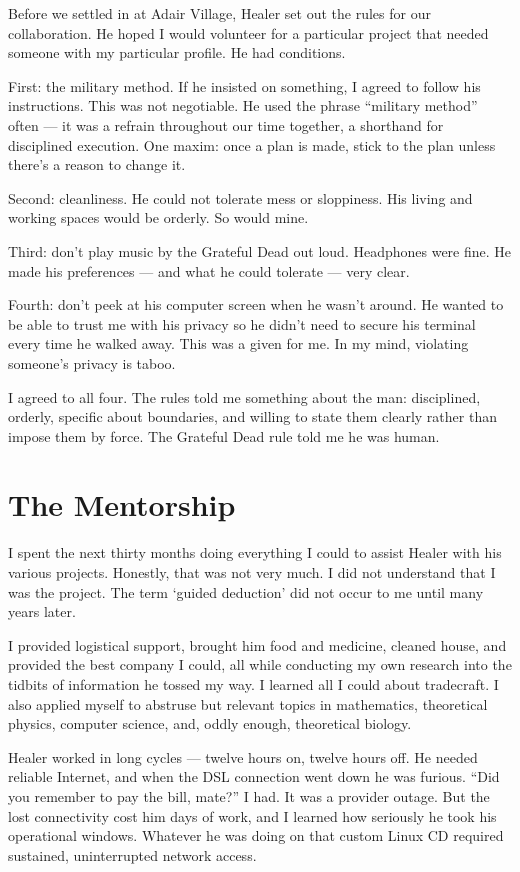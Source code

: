 Before we settled in at Adair Village, Healer set out the rules for our collaboration. He hoped I would volunteer for a particular project that needed someone with my particular profile. He had conditions.

First: the military method. If he insisted on something, I agreed to follow his instructions. This was not negotiable. He used the phrase ``military method'' often --- it was a refrain throughout our time together, a shorthand for disciplined execution. One maxim: once a plan is made, stick to the plan unless there's a reason to change it.

Second: cleanliness. He could not tolerate mess or sloppiness. His living and working spaces would be orderly. So would mine.

Third: don't play music by the Grateful Dead out loud. Headphones were fine. He made his preferences --- and what he could tolerate --- very clear.

Fourth: don't peek at his computer screen when he wasn't around. He wanted to be able to trust me with his privacy so he didn't need to secure his terminal every time he walked away. This was a given for me. In my mind, violating someone's privacy is taboo.

I agreed to all four. The rules told me something about the man: disciplined, orderly, specific about boundaries, and willing to state them clearly rather than impose them by force. The Grateful Dead rule told me he was human.

\section*{The Mentorship}
\label{record:af-the-mentorship}

I spent the next thirty months doing everything I could to assist Healer with his various projects. Honestly, that was not very much. I did not understand that I was the project. The term `guided deduction' did not occur to me until many years later.

I provided logistical support, brought him food and medicine, cleaned house, and provided the best company I could, all while conducting my own research into the tidbits of information he tossed my way. I learned all I could about tradecraft. I also applied myself to abstruse but relevant topics in mathematics, theoretical physics, computer science, and, oddly enough, theoretical biology.

Healer worked in long cycles --- twelve hours on, twelve hours off. He needed reliable Internet, and when the DSL connection went down he was furious. ``Did you remember to pay the bill, mate?'' I had. It was a provider outage. But the lost connectivity cost him days of work, and I learned how seriously he took his operational windows. Whatever he was doing on that custom Linux CD required sustained, uninterrupted network access.

